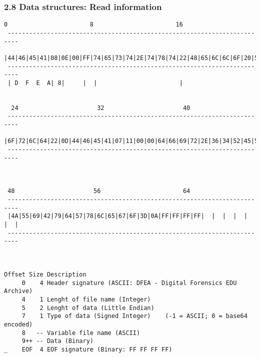 \begin{frame}[fragile]
  \frametitle{2.8 Data structures: Read information}
\begin{lstlisting}[basicstyle=\tiny]
  0                       8                       16                      
 ------------------------------------------------------------------------- 
 |44|46|45|41|08|0E|00|FF|74|65|73|74|2E|74|78|74|22|48|65|6C|6C|6F|20|57|
 -------------------------------------------------------------------------
 | D  F  E  A| 8|     |  |                       |                      


  24                      32                      40
 -------------------------------------------------------------------------
 |6F|72|6C|64|22|0D|44|46|45|41|07|11|00|00|64|66|69|72|2E|36|34|52|45|5A|
 -------------------------------------------------------------------------
                   


 48                      56                       64
 -------------------------------------------------------------------------
 |4A|55|69|42|79|64|57|78|6C|65|67|6F|3D|0A|FF|FF|FF|FF|  |  |  |  |  |  |
 -------------------------------------------------------------------------



Offset Size Description
     0    4 Header signature (ASCII: DFEA - Digital Forensics EDU Archive)
     4    1 Lenght of file name (Integer)
     5    2 Lenght of data (Little Endian)
     7    1 Type of data (Signed Integer)    (-1 = ASCII; 0 = base64 encoded)
     8   -- Variable file name (ASCII)
     9++ -- Data (Binary)
_    EOF  4 EOF signature (Binary: FF FF FF FF)
\end{lstlisting}
\end{frame}


